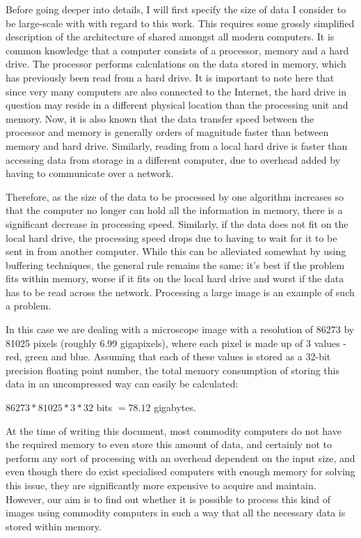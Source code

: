 \documentclass [12pt,a4paper]{report}
\begin{document}
Before going deeper into details, I will first specify the size of data I consider to be large-scale with with regard to this work. This requires some grossly simplified description of the architecture of shared amongst all modern computers. It is common knowledge that a computer consists of a processor, memory and a hard drive. The processor performs calculations on the data stored in memory, which has previously been read from a hard drive. It is important to note here that since very many computers are also connected to the Internet, the hard drive in question may reside in a different physical location than the processing unit and memory. Now, it is also known that the data transfer speed between the processor and memory is generally orders of magnitude faster than between memory and hard drive. Similarly, reading from a local hard drive is faster than accessing data from storage in a different computer, due to overhead added by having to communicate over a network.

Therefore, as the size of the data to be processed by one algorithm increases so that the computer no longer can hold all the information in memory, there is a significant decrease in processing speed. Similarly, if the data does not fit on the local hard drive, the processing speed drops due to having to wait for it to be sent in from another computer. While this can be alleviated somewhat by using buffering techniques, the general rule remains the same: it's best if the problem fits within memory, worse if it fits on the local hard drive and worst if the data has to be read across the network. Processing a large image is an example of such a problem.

In this case we are dealing with a microscope image with a resolution of 86273 by 81025 pixels (roughly 6.99 gigapixels), where each pixel is made up of 3 values - red, green and blue. Assuming that each of these values is stored as a 32-bit precision floating point number, the total memory consumption of storing this data in an uncompressed way can easily be calculated:

\begin{center}
$ 86273 * 81025 * 3 * 32$ bits $ = 78.12 $ gigabytes.
\end{center}

At the time of writing this document, most commodity computers do not have the required memory to even store this amount of data, and certainly not to perform any sort of processing with an overhead dependent on the input size, and even though there do exist specialised computers with enough memory for solving this issue, they are significantly more expensive to acquire and maintain. However, our aim is to find out whether it is possible  to process this kind of images using commodity computers in such a way that all the necessary data is stored within memory.
\end{document}
